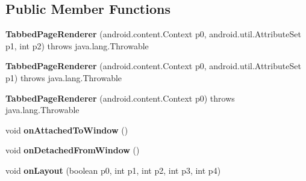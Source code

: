 \subsection*{Public Member Functions}
\begin{DoxyCompactItemize}
\item 
\mbox{\label{classmd5270abb39e60627f0f200893b490a1ade_1_1TabbedPageRenderer_a29adb24329fe37a1044a6c6e485282a5}} 
{\bfseries Tabbed\+Page\+Renderer} (android.\+content.\+Context p0, android.\+util.\+Attribute\+Set p1, int p2)  throws java.\+lang.\+Throwable 	
\item 
\mbox{\label{classmd5270abb39e60627f0f200893b490a1ade_1_1TabbedPageRenderer_aa9ac414c6055675bf9eff78fe6f0672e}} 
{\bfseries Tabbed\+Page\+Renderer} (android.\+content.\+Context p0, android.\+util.\+Attribute\+Set p1)  throws java.\+lang.\+Throwable 	
\item 
\mbox{\label{classmd5270abb39e60627f0f200893b490a1ade_1_1TabbedPageRenderer_aeaaca922e7a247b9e498dce320b2fb99}} 
{\bfseries Tabbed\+Page\+Renderer} (android.\+content.\+Context p0)  throws java.\+lang.\+Throwable 	
\item 
\mbox{\label{classmd5270abb39e60627f0f200893b490a1ade_1_1TabbedPageRenderer_a2ceb284d7b665527be964c40f6d41f74}} 
void {\bfseries on\+Attached\+To\+Window} ()
\item 
\mbox{\label{classmd5270abb39e60627f0f200893b490a1ade_1_1TabbedPageRenderer_a2da48a997944fab9d1e33dfbf720a558}} 
void {\bfseries on\+Detached\+From\+Window} ()
\item 
\mbox{\label{classmd5270abb39e60627f0f200893b490a1ade_1_1TabbedPageRenderer_ac4353b82562a8ecc7822860dd790a58f}} 
void {\bfseries on\+Layout} (boolean p0, int p1, int p2, int p3, int p4)
\item 
\mbox{\label{classmd5270abb39e60627f0f200893b490a1ade_1_1TabbedPageRenderer_a2f19345d253dcfa7a6ad6abbaf641e8a}} 

\end{DoxyCompactItemize}
